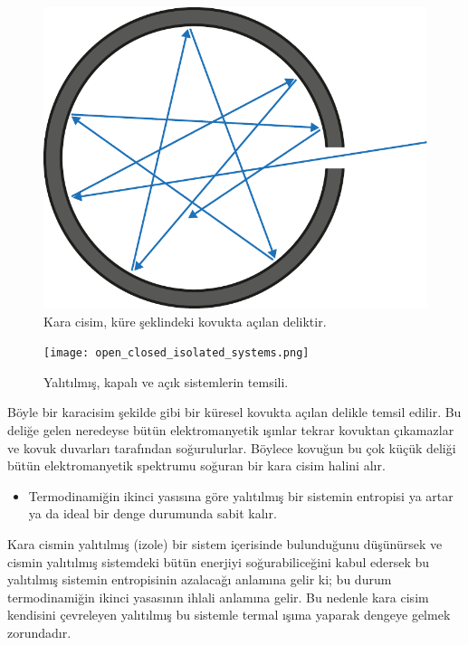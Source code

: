 \documentclass[a4paper,12pt, twoside]{article}
\begin{document}
\begin{figure}
\center
\includegraphics[scale=.5]{Black_body_realization.pdf}
\caption{Kara cisim, küre şeklindeki kovukta açılan deliktir.}
\label{fig:karacisim}
\end{figure}

\begin{figure}
	\center
	\texttt{[image: open\_closed\_isolated\_systems.png]}
	\caption{Yalıtılmış, kapalı ve açık sistemlerin temsili.}
	\label{fig:systems_isolated}
\end{figure}


Böyle bir karacisim şekilde gibi bir küresel kovukta açılan delikle temsil edilir. Bu deliğe gelen neredeyse bütün elektromanyetik ışınlar tekrar kovuktan çıkamazlar ve kovuk duvarları tarafından soğurulurlar. Böylece kovuğun bu çok küçük deliği bütün elektromanyetik spektrumu soğuran bir kara cisim halini alır.

\begin{itemize}
\item Termodinamiğin ikinci yasısına göre yalıtılmış bir sistemin entropisi ya artar ya da ideal bir denge durumunda sabit kalır.
\end{itemize}

Kara cismin yalıtılmış (izole) bir sistem içerisinde bulunduğunu düşünürsek ve cismin yalıtılmış sistemdeki bütün enerjiyi soğurabiliceğini kabul edersek bu yalıtılmış sistemin entropisinin azalacağı anlamına gelir ki; bu durum termodinamiğin ikinci yasasının ihlali anlamına gelir. Bu nedenle kara cisim kendisini çevreleyen yalıtılmış bu sistemle termal ışıma yaparak dengeye gelmek zorundadır.
\end{document}
